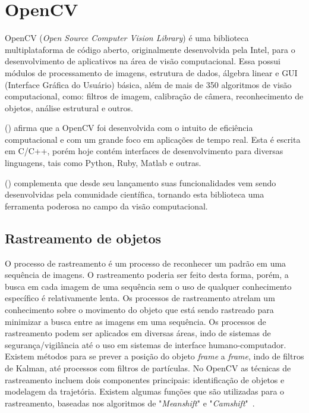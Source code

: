 \section{OpenCV}
\label{sec:opencv}


OpenCV (\textit{Open Source Computer Vision Library}) é uma biblioteca multiplataforma de código aberto, originalmente desenvolvida pela Intel, para o desenvolvimento de aplicativos na área de visão computacional. Essa possui módulos de processamento de imagens, estrutura de dados, álgebra linear e GUI (Interface Gráfica do Usuário) básica, além de mais de 350 algoritmos de visão computacional, como: filtros de imagem, calibração de câmera, reconhecimento de objetos, análise estrutural e outros.

\citeauthor{bradski2008learning} (\citeyear{bradski2008learning}) afirma que a OpenCV foi desenvolvida com o intuito de eficiência computacional e com um grande foco em aplicações de tempo real. Esta é escrita em C/C++, porém hoje contém interfaces de desenvolvimento para diversas linguagens, tais como Python, Ruby, Matlab e outras.

\citeauthor{baggio2015opencv} (\citeyear{baggio2015opencv}) complementa que desde seu lançamento suas funcionalidades vem sendo desenvolvidas pela comunidade científica, tornando esta biblioteca uma ferramenta poderosa no campo da visão computacional.

\subsection{Rastreamento de objetos}
\label{subsec:rastreamentoObjtos}

O processo de rastreamento é um processo de reconhecer um padrão em uma sequência de imagens. O rastreamento poderia ser feito desta forma, porém, a busca em cada imagem de uma sequência sem o uso de qualquer conhecimento específico é relativamente lenta. Os processos de rastreamento atrelam um conhecimento sobre o movimento do objeto que está sendo rastreado para minimizar a busca entre as imagens em uma sequência. Os processos de rastreamento podem ser aplicados em diversas áreas, indo de sistemas de segurança/vigilância até o uso em sistemas de interface humano-computador. Existem métodos para se prever a posição do objeto \textit{frame} a \textit{frame}, indo de filtros de Kalman, até processos com filtros de partículas. No OpenCV as técnicas de rastreamento incluem dois componentes principais: identificação de objetos e modelagem da trajetória. Existem algumas funções que são utilizadas para o rastreamento, baseadas nos algoritmos de "\textit{Meanshift}" e "\textit{Camshift}"~\cite{marengoni2009tutorial}.

